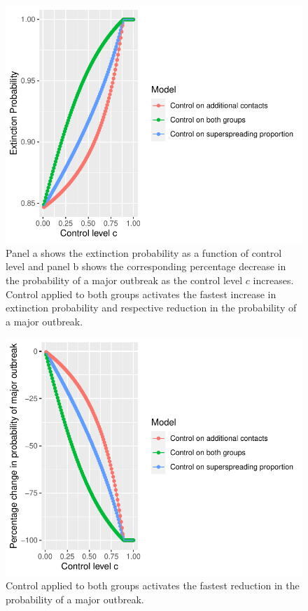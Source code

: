 \documentclass{imammb}
\numberwithin{equation}{section}
\begin{document}

\begin{figure}
    \centering
    \includegraphics{Figure8.pdf}
    \caption{Panel a shows the extinction probability as a function of control level and panel b shows the corresponding percentage decrease in the probability of a major outbreak as the control level $c$ increases. Control applied to both groups activates the fastest increase in extinction probability and respective reduction in the probability of a major outbreak.  }
    \label{fig:extprob}
\end{figure}

\begin{figure}
    \centering
    \includegraphics{Figure10.pdf}
    \caption{Control applied to both groups activates the fastest reduction in the probability of a major outbreak.}
    \label{fig:percentchange}
\end{figure}
\end{document}
